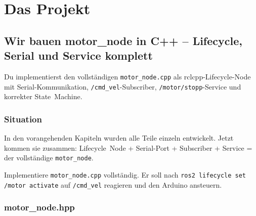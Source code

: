 
\part{Das Projekt}

\chapter{Wir bauen motor\_node in C++ –
  Lifecycle, Serial und Service komplett}

\begin{lernziele}
Du implementierst den vollständigen \texttt{motor\_node.cpp}
als rclcpp-Lifecycle-Node mit Serial-Kommunikation,
\texttt{/cmd\_vel}-Subscriber, \texttt{/motor/stopp}-Service
und korrekter State~Machine.
\end{lernziele}

\section{Situation}

In den vorangehenden Kapiteln wurden alle Teile einzeln entwickelt.
Jetzt kommen sie zusammen:
Lifecycle~Node + Serial-Port + Subscriber + Service = der vollständige \texttt{motor\_node}.

\begin{aufgabeBox}
Implementiere \texttt{motor\_node.cpp} vollständig.
Er soll nach \texttt{ros2 lifecycle set /motor activate}
auf \texttt{/cmd\_vel} reagieren und den Arduino ansteuern.
\end{aufgabeBox}

\section{motor\_node.hpp}

